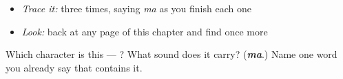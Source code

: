 \begin{itemize}
\raggedright
  \item \emph{Trace it:}  three times, saying \emph{ma} as you finish each one
  \item \emph{Look:} back at any page of this chapter and find  once more
\end{itemize}

\begin{tcolorbox}[breakable,colback=teal!4,colframe=teal!35!black,title={Before you move on}]
Which character is this — ? What sound does it carry? (\emph{\textbf{ma}}.) Name one word you already say that contains it.
\end{tcolorbox}
